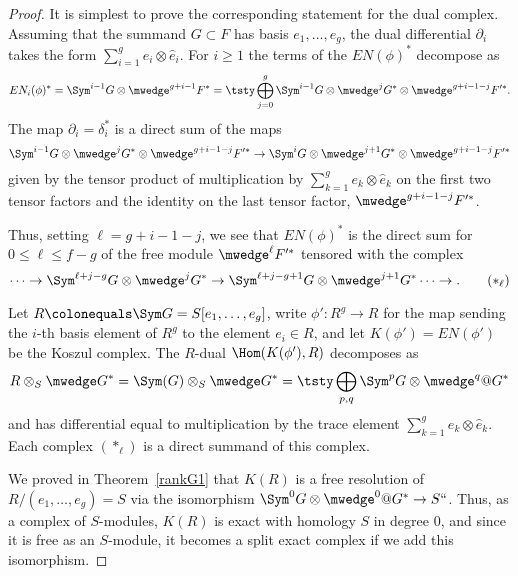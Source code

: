 \begin{proof}
It is simplest to prove the corresponding statement for the dual complex. 
Assuming that the summand $G\subset F$ has basis $e_{1},
\dots, e_{g}$,
the dual differential $\partial_{i}$ takes the form $\sum_{i=1}^{g}
e_{i}\otimes \hat e_{i}$.
For $i\geq 1$ the terms of the $EN(\phi)^{*}$ decompose as
$$
EN_{i}(\phi)^{*} = \Sym^{i-1}G \otimes  \mwedge^{g+i-1}F^{*}  =
\tsty\bigoplus\limits_{j=0}^{g} \Sym^{i-1}G \otimes  \mwedge^{j}G^{*} \otimes
\mwedge^{g+i-1-j}F'^{*}.
$$
The map $\partial_{i}= \delta_{i}^{*}$ is a direct sum
of the maps
$$
\Sym^{i-1}G \otimes  \mwedge^{j}G^{*} \otimes \mwedge^{g+i-1-j}F'^{*}
\to
\Sym^{i}G \otimes  \mwedge^{j+1}G^{*} \otimes \mwedge^{g+i-1-j}F'^{*}
$$
given by the tensor product of multiplication by $\sum_{k=1}^{g} e_{k}\otimes
\hat e_{k}$
on the first two tensor factors and the identity on the last tensor factor,
$\mwedge^{g+i-1-j}F'^{*}$.

Thus, setting $\ell = g+i-1-j$, we see that   $EN(\phi)^{*}$ is the direct sum for
$0\leq \ell \leq f-g$ of the free module 
$\mwedge^{\ell}F'^{*}$ tensored with the complex
\begin{equation}
\cdots\to \Sym^{\ell + j -g}G \otimes  \mwedge^{j}G^{*}  \to
 \Sym^{\ell + j -g+1}G \otimes  \mwedge^{j+1}G^{*}\cdots\to .
\tag{$*_\ell$}
\label{starj}
\end{equation}


Let $R \colonequals \Sym G = S[e_{1}, \dots, e_{g}]$,  write 
$\phi': R^{g} \to R$ for the map sending the $i$-th basis
element of $R^{g}$ to the element $e_{i}\in R$, and let $K(\phi') = EN(\phi')$
be the Koszul complex. The $R$-dual $\Hom(K(\phi'), R)$ 
%
decomposes as
$$
R\otimes_{S}\mwedge G^* =   \Sym(G)\otimes_{S} \mwedge G^* = 
\tsty\bigoplus\limits_{p,q}\Sym^{p}G\otimes\mwedge^{q}@G^*
$$
and has differential equal to multiplication by the trace element $\sum_{k=1}^{g} e_{k}\otimes
\hat e_{k}$. Each complex $(*_{\ell})$ is a direct summand of this complex.


We 
proved
in Theorem~\ref{rankG1} that $K(R)$ is a free resolution
of $R/(e_1, \dots, e_g)=S$ via the isomorphism
 $\Sym^{0}G\otimes \mwedge^{0}@G^*\to S` `$. Thus,
 as a complex of $S$-modules, $K(R)$
 is exact with homology $S$ in degree 0, and since it is free as an $S$-module,
 it becomes a split exact complex if we add this isomorphism.
 

\end{proof}
